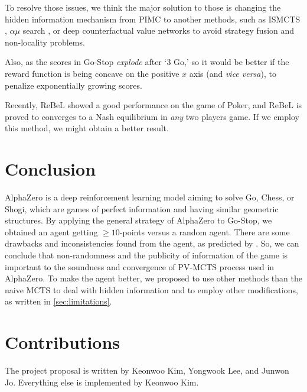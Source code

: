 \documentclass[10pt,twocolumn,letterpaper]{article}
\begin{document}
To resolve those issues, we think the major solution to those is changing the hidden information mechanism from PIMC to another methods, such as ISMCTS \cite{Cow2012}, $\alpha\mu$ search \cite{CazVen2019}, or deep counterfactual value networks \cite{Mor2017} to avoid strategy fusion and non-locality problems.

Also, as the scores in Go-Stop \textit{explode} after `3 Go,' so it would be better if the reward function is being concave on the positive $x$ axis (and \textit{vice versa}), to penalize exponentially growing scores.

Recently, ReBeL \cite{Bro2020} showed a good performance on the game of Poker, and ReBeL is proved to converges to a Nash equilibrium in \textit{any} two players game. If we employ this method, we might obtain a better result.

\section{Conclusion}
AlphaZero is a deep reinforcement learning model aiming to solve Go, Chess, or Shogi, which are games of perfect information and having similar geometric structures. By applying the general strategy of AlphaZero to Go-Stop, we obtained an agent getting $\ge 10$-points versus a random agent. There are some drawbacks and inconsistencies found from the agent, as predicted by \cite{FraBas1998}. So, we can conclude that non-randomness and the publicity of information of the game is important to the soundness and convergence of PV-MCTS process used in AlphaZero. To make the agent better, we proposed to use other methods than the naive MCTS to deal with hidden information and to employ other modifications, as written in \cref{sec:limitations}.

\section*{Contributions}
The project proposal is written by Keonwoo Kim, Yongwook Lee, and Junwon Jo. Everything else is implemented by Keonwoo Kim.


\newpage


{\small


}
\end{document}
